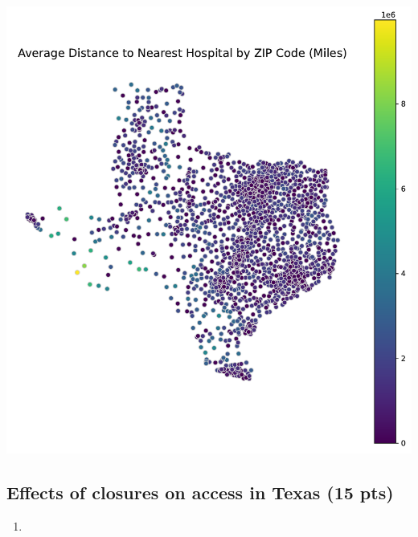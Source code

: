 \documentclass[
  letterpaper,
  DIV=11,
  numbers=noendperiod]{scrartcl}
\providecommand{\tightlist}{%
  \setlength{\itemsep}{0pt}\setlength{\parskip}{0pt}}\usepackage{longtable,booktabs,array}
\begin{document}
\includegraphics{pset4_submission_files/figure-pdf/cell-23-output-1.pdf}

\subsection{Effects of closures on access in Texas (15
pts)}\label{effects-of-closures-on-access-in-texas-15-pts}

\begin{enumerate}
\def\labelenumi{\arabic{enumi}.}
\tightlist
\item
\end{enumerate}
\end{document}
